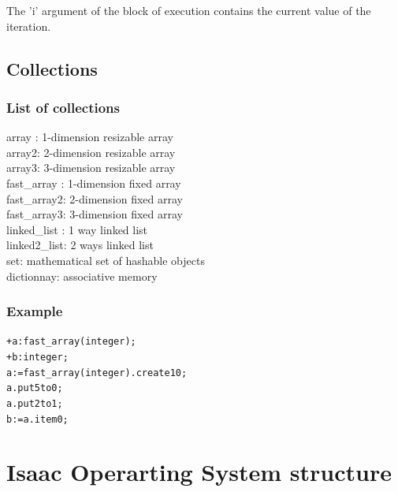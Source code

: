 \documentclass[11pt]{mybook}
\begin{document}
The 'i' argument of the block of execution contains
the current value of the iteration.

\section{Collections}
\label{lisaac_world:collections}
%
\subsection{List of collections}
\label{lisaac_world:collections:list}
{\sc{} array} : 1-dimension resizable array\\
{\sc{} array2}: 2-dimension resizable array\\
{\sc{} array3}: 3-dimension resizable array \\
{\sc{} fast\_array} : 1-dimension fixed array\\
{\sc{} fast\_array2}: 2-dimension fixed array\\
{\sc{} fast\_array3}: 3-dimension fixed array\\
{\sc{} linked\_list} : 1 way linked list\\
{\sc{} linked2\_list}: 2 ways linked list\\
{\sc{} set}: mathematical set of hashable objects\\
{\sc{} dictionnay}: associative memory\\

\subsection{Example}
\label{lisaac_world:collections:example}
\begin{alltt}
    + a:{\sc{}fast\_array}({\sc{}integer});
    + b:{\sc{}integer};
    a := {\sc{}fast\_array}({\sc{}integer}).create 10;
    a.put 5 to 0;
    a.put 2 to 1;
    b := a.item 0;
\end{alltt}

\chapter{Isaac Operarting System structure}
\label{isaac}
%
\end{document}
